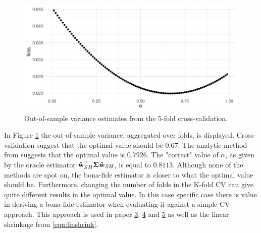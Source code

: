 \documentclass[12pt, oneside]{book}\usepackage{knitr}
\begin{document}
{\begin{knitrout}
\end{knitrout}

\begin{knitrout}\small
{}\color{fgcolor}\begin{figure}

{\centering \includegraphics[width=\maxwidth]{figure/cv_benchmark-1} 

}

\caption[Out-of-sample variance estimates from the 5-fold cross-validation]{Out-of-sample variance estimates from the 5-fold cross-validation.}\label{fig:cv_benchmark}
\end{figure}

\end{knitrout}

In Figure \ref{fig:cv_benchmark} the out-of-sample variance, aggregated over folds, is displayed. 
Cross-validation suggest that the optimal value should be $0.67$. 
The analytic method from \citet{bodnar2018estimation} suggests that the optimal value is $0.7926$.
The "correct" value of $\alpha$, as given by the oracle estimator $\mathbf{\hat{w}}_{SH}^\top\mathbf{\Sigma} \mathbf{\hat{w}}_{SH}$, is equal to $0.8113$. 
Although none of the methods are spot on, the bona-fide estimator is closer to what the optimal value should be.
Furthermore, changing the number of folds in the K-fold CV can give quite different results in the optimal value.
In this case specific case there is value in deriving a bona-fide estimator when evaluating it against a simple CV approach.
This approach is used in paper \hyperref[sec:paper3]{3}, \hyperref[sec:paper4]{4} and \hyperref[sec:paper5]{5} as well as the linear shrinkage from \eqref{eqn:linshrink}.

}
\end{document}
